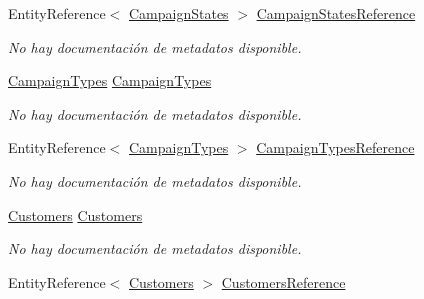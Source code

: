 \begin{DoxyCompactItemize}
Entity\-Reference$<$ \hyperlink{class_microsoft_1_1_samples_1_1_kinect_1_1_basic_interactions_1_1_campaign_states}{Campaign\-States} $>$ \hyperlink{class_microsoft_1_1_samples_1_1_kinect_1_1_basic_interactions_1_1_advert_campaigns_a5715e41ad55e7057d6f247652b91c988}{Campaign\-States\-Reference}
\begin{DoxyCompactList}\small\item\em No hay documentación de metadatos disponible. \end{DoxyCompactList}\item 
\hyperlink{class_microsoft_1_1_samples_1_1_kinect_1_1_basic_interactions_1_1_campaign_types}{Campaign\-Types} \hyperlink{class_microsoft_1_1_samples_1_1_kinect_1_1_basic_interactions_1_1_advert_campaigns_a3522ebbbfaf5208812f309421c8e4323}{Campaign\-Types}
\begin{DoxyCompactList}\small\item\em No hay documentación de metadatos disponible. \end{DoxyCompactList}\item 
Entity\-Reference$<$ \hyperlink{class_microsoft_1_1_samples_1_1_kinect_1_1_basic_interactions_1_1_campaign_types}{Campaign\-Types} $>$ \hyperlink{class_microsoft_1_1_samples_1_1_kinect_1_1_basic_interactions_1_1_advert_campaigns_af9a652f6edbadf1f9adcfeade081103c}{Campaign\-Types\-Reference}
\begin{DoxyCompactList}\small\item\em No hay documentación de metadatos disponible. \end{DoxyCompactList}\item 
\hyperlink{class_microsoft_1_1_samples_1_1_kinect_1_1_basic_interactions_1_1_customers}{Customers} \hyperlink{class_microsoft_1_1_samples_1_1_kinect_1_1_basic_interactions_1_1_advert_campaigns_a2950b1e756ec9196351098b9540e5787}{Customers}
\begin{DoxyCompactList}\small\item\em No hay documentación de metadatos disponible. \end{DoxyCompactList}\item 
Entity\-Reference$<$ \hyperlink{class_microsoft_1_1_samples_1_1_kinect_1_1_basic_interactions_1_1_customers}{Customers} $>$ \hyperlink{class_microsoft_1_1_samples_1_1_kinect_1_1_basic_interactions_1_1_advert_campaigns_a7cbc1c853e84208882a4998ce1d244fa}{Customers\-Reference}

\end{DoxyCompactItemize}
